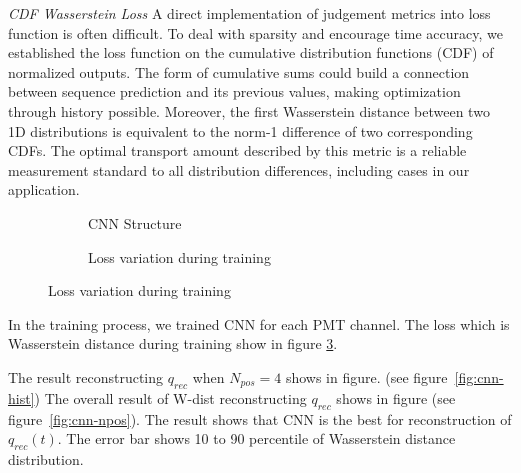 \emph{CDF Wasserstein Loss}
A direct implementation of judgement metrics into loss function is often difficult. To deal with sparsity and encourage time accuracy, we established the loss function on the cumulative distribution functions (CDF) of normalized outputs. The form of cumulative sums could build a connection between sequence prediction and its previous values, making optimization through history possible. Moreover, the first Wasserstein distance between two 1D distributions is equivalent to the norm-1 difference of two corresponding CDFs. The optimal transport amount described by this metric is a reliable measurement standard to all distribution differences, including cases in our application.

\begin{figure}[H]
\begin{minipage}[b]{.4\textwidth}
\begin{figure}[H]
    \begin{center}
    \begin{adjustbox}{width=0.6\textwidth}
        
    \end{adjustbox}
    \end{center}
    \caption{\label{fig:struct} CNN Structure}
\end{figure}
\end{minipage}
\begin{minipage}[b]{.6\textwidth}
\begin{figure}[H]
    \centering
    \resizebox{\textwidth}{!}{}
    \caption{\label{fig:loss} Loss variation during training}
\end{figure}
\end{minipage}
\end{figure}

In the training process, we trained CNN for each PMT channel. The loss which is Wasserstein distance during training show in figure \ref{fig:loss}. 

The result reconstructing $q_{rec}$ when $N_{pos}=4$ shows in figure. (see figure~\ref{fig:cnn-hist}) The overall result of W-dist reconstructing $q_{rec}$ shows in figure (see figure~\ref{fig:cnn-npos}). The result shows that CNN is the best for reconstruction of $q_{rec}(t)$. The error bar shows 10 to 90 percentile of Wasserstein distance distribution. 

